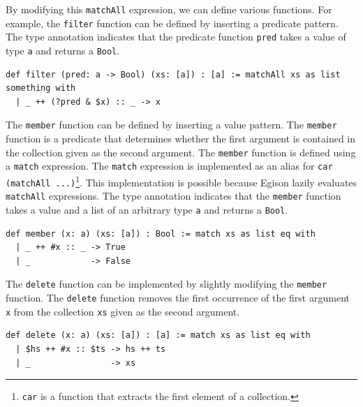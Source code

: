 By modifying this \lstinline{matchAll} expression, we can define various functions.
For example, the \lstinline{filter} function can be defined by inserting a predicate pattern.
The type annotation indicates that the predicate function \lstinline{pred} takes a value of type \lstinline{a} and returns a \lstinline{Bool}.

\begin{lstlisting}[language=egison,numbers=none]
def filter (pred: a -> Bool) (xs: [a]) : [a] := matchAll xs as list something with
  | _ ++ (?pred & $x) :: _ -> x
\end{lstlisting}

The \lstinline{member} function can be defined by inserting a value pattern.
The \lstinline{member} function is a predicate that determines whether the first argument is contained in the collection given as the second argument.
The \lstinline{member} function is defined using a \lstinline{match} expression.
The \lstinline{match} expression is implemented as an alias for \lstinline{car (matchAll ...)}\footnote{\lstinline{car} is a function that extracts the first element of a collection.}.
This implementation is possible because Egison lazily evaluates \lstinline{matchAll} expressions.
The type annotation indicates that the \lstinline{member} function takes a value and a list of an arbitrary type \lstinline{a} and returns a \lstinline{Bool}.

{\footnotesize
\begin{lstlisting}[language=egison,numbers=none]
def member (x: a) (xs: [a]) : Bool := match xs as list eq with
  | _ ++ #x :: _ -> True
  | _            -> False
\end{lstlisting}
}

The \lstinline{delete} function can be implemented by slightly modifying the \lstinline{member} function.
The \lstinline{delete} function removes the first occurrence of the first argument \lstinline{x} from the collection \lstinline{xs} given as the second argument.

{\footnotesize
\begin{lstlisting}[language=egison,numbers=none]
def delete (x: a) (xs: [a]) : [a] := match xs as list eq with
  | $hs ++ #x :: $ts -> hs ++ ts
  | _                -> xs
\end{lstlisting}
}

